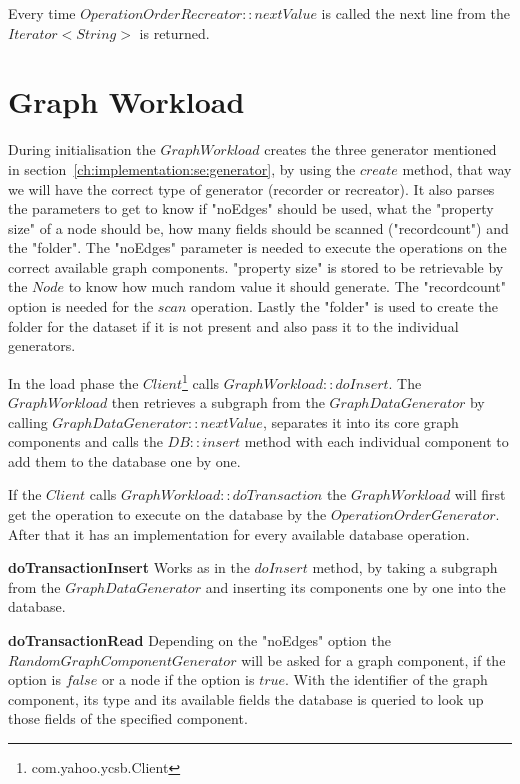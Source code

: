 Every time $ OperationOrderRecreator::nextValue $ is called the next line from the $ Iterator<String> $ is returned.

\section{Graph Workload}
\label{ch:implementation:se:graphWorkload}
During initialisation the $ GraphWorkload $ creates the three generator mentioned in section~\ref{ch:implementation:se:generator},
by using the $ create $ method,
that way we will have the correct type of generator (recorder or recreator).
It also parses the parameters to get to know if "noEdges" should be used,
what the "property size" of a node should be,
how many fields should be scanned ("recordcount") and the "folder".
The "noEdges" parameter is needed to execute the operations on the correct available graph components.
"property size" is stored to be retrievable by the $ Node $ to know how much random value it should generate.
The "recordcount" option is needed for the $ scan $ operation.
Lastly the "folder" is used to create the folder for the dataset if it is not present and also pass it to the individual generators.

In the load phase the $ Client $\footnote{com.yahoo.ycsb.Client} calls $ GraphWorkload::doInsert $.
The $ GraphWorkload $ then retrieves a subgraph from the $ GraphDataGenerator $ by calling $ GraphDataGenerator::nextValue $,
separates it into its core graph components and calls the $ DB::insert $ method with each individual component to add them to the database one by one.

If the $ Client $ calls $ GraphWorkload::doTransaction $ the $ GraphWorkload $ will first get the operation to execute on the database by the $ OperationOrderGenerator $.
After that it has an implementation for every available database operation.

\textbf{doTransactionInsert} \newline
Works as in the $ doInsert $ method,
by taking a subgraph from the $ GraphDataGenerator $ and inserting its components one by one into the database.

\textbf{doTransactionRead}
Depending on the "noEdges" option the $ RandomGraphComponentGenerator $ will be asked for a graph component,
if the option is $ false $ or a node if the option is $ true $.
With the identifier of the graph component,
its type and its available fields the database is queried to look up those fields of the specified component.

